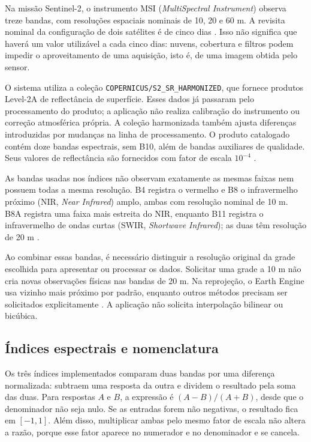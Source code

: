 Na missão Sentinel-2, o instrumento MSI (\textit{MultiSpectral Instrument}) observa treze bandas, com resoluções espaciais nominais de 10, 20 e 60 m. A revisita nominal da configuração de dois satélites é de cinco dias \citep{ESA_SENTINEL2}. Isso não significa que haverá um valor utilizável a cada cinco dias: nuvens, cobertura e filtros podem impedir o aproveitamento de uma aquisição, isto é, de uma imagem obtida pelo sensor.

O sistema utiliza a coleção \texttt{COPERNICUS/S2\_SR\_HARMONIZED}, que fornece produtos Level-2A de reflectância de superfície. Esses dados já passaram pelo processamento do produto; a aplicação não realiza calibração do instrumento ou correção atmosférica própria. A coleção harmonizada também ajusta diferenças introduzidas por mudanças na linha de processamento. O produto catalogado contém doze bandas espectrais, sem B10, além de bandas auxiliares de qualidade. Seus valores de reflectância são fornecidos com fator de escala $10^{-4}$ \citep{GOOGLE_S2_SR}.

As bandas usadas nos índices não observam exatamente as mesmas faixas nem possuem todas a mesma resolução. B4 registra o vermelho e B8 o infravermelho próximo (NIR, \textit{Near Infrared}) amplo, ambas com resolução nominal de 10 m. B8A registra uma faixa mais estreita do NIR, enquanto B11 registra o infravermelho de ondas curtas (SWIR, \textit{Shortwave Infrared}); as duas têm resolução de 20 m \citep{GOOGLE_S2_SR}.

Ao combinar essas bandas, é necessário distinguir a resolução original da grade escolhida para apresentar ou processar os dados. Solicitar uma grade a 10 m não cria novas observações físicas nas bandas de 20 m. Na reprojeção, o Earth Engine usa vizinho mais próximo por padrão, enquanto outros métodos precisam ser solicitados explicitamente \citep{GOOGLE_EE_RESAMPLE}. A aplicação não solicita interpolação bilinear ou bicúbica.

\subsection{Índices espectrais e nomenclatura}\label{sec:indices-final}

Os três índices implementados comparam duas bandas por uma diferença normalizada: subtraem uma resposta da outra e dividem o resultado pela soma das duas. Para respostas $A$ e $B$, a expressão é $(A-B)/(A+B)$, desde que o denominador não seja nulo. Se as entradas forem não negativas, o resultado fica em $[-1,1]$. Além disso, multiplicar ambas pelo mesmo fator de escala não altera a razão, porque esse fator aparece no numerador e no denominador e se cancela.


